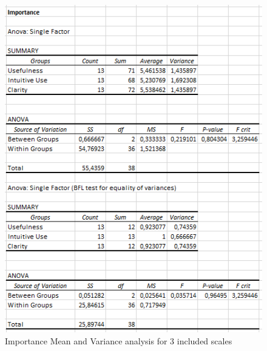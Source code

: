 \documentclass[a4paper, 11pt]{article}
\begin{document}
\newpage
\begin{figure}[h!]
	\centering
	\includegraphics[width=0.7\linewidth]{figures/importance}
	\caption{Importance Mean and Variance analysis for 3 included scales}
	\label{fig:impo}
\end{figure}
\newpage
\end{document}
